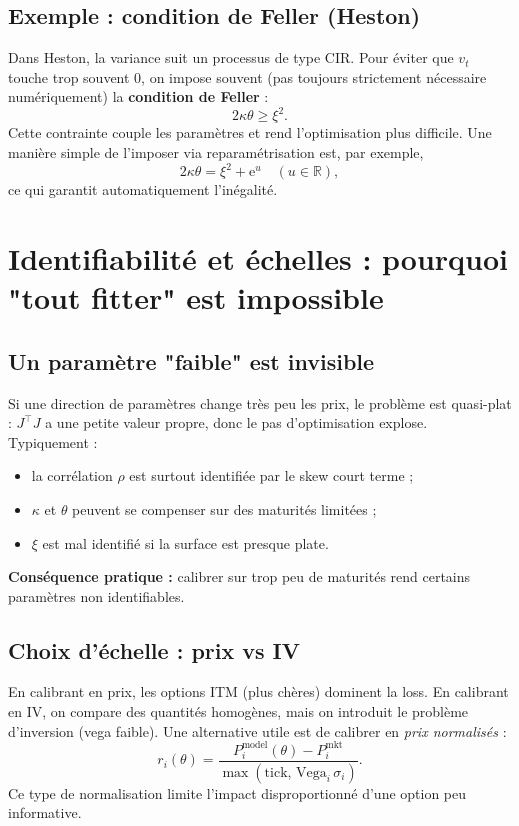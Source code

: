 \documentclass[11pt,a4paper]{report}
\newcommand{\ee}{\mathrm{e}}
\newcommand{\R}{\mathbb{R}}
\newcommand{\1}{\mathbbm{1}}
\newcommand{\vega}{\mathrm{Vega}}
\theoremstyle{definition}
\theoremstyle{plain}
\theoremstyle{remark}
\begin{document}
\subsection{Exemple : condition de Feller (Heston)}
Dans Heston, la variance suit un processus de type CIR. Pour éviter que $v_t$ touche trop souvent 0,
on impose souvent (pas toujours strictement nécessaire numériquement) la \textbf{condition de Feller} :
\[
2\kappa\theta \ge \xi^2.
\]
Cette contrainte couple les paramètres et rend l'optimisation plus difficile.
Une manière simple de l'imposer via reparamétrisation est, par exemple,
\[2\kappa\theta = \xi^2 + \ee^{u}\quad (u\in\R),
\]
ce qui garantit automatiquement l'inégalité.

\section{Identifiabilité et échelles : pourquoi "tout fitter" est impossible}

\subsection{Un paramètre "faible" est invisible}
Si une direction de paramètres change très peu les prix, le problème est quasi-plat :
\(J^\top J\) a une petite valeur propre, donc le pas d'optimisation explose.
Typiquement :
\begin{itemize}
  \item la corrélation $\rho$ est surtout identifiée par le skew court terme ;
  \item $\kappa$ et $\theta$ peuvent se compenser sur des maturités limitées ;
  \item $\xi$ est mal identifié si la surface est presque plate.
\end{itemize}
\textbf{Conséquence pratique :} calibrer sur trop peu de maturités rend certains paramètres non identifiables.

\subsection{Choix d'échelle : prix vs IV}
En calibrant en prix, les options ITM (plus chères) dominent la loss.
En calibrant en IV, on compare des quantités homogènes, mais on introduit le problème d'inversion (vega faible).
Une alternative utile est de calibrer en \emph{prix normalisés} :
\[
r_i(\theta)=\frac{P_i^{\mathrm{model}}(\theta)-P_i^{\mathrm{mkt}}}{\max(\text{tick},\,\vega_i\,\sigma_i)}.
\]
Ce type de normalisation limite l'impact disproportionné d'une option peu informative.
\end{document}
